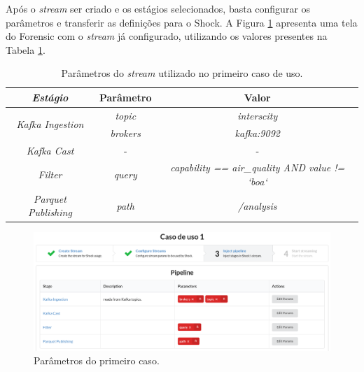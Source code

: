 

Após o \textit{stream} ser criado e os estágios selecionados, basta
configurar os parâmetros e transferir as definições para o Shock. A Figura
\ref{fig:case1} apresenta uma tela do Forensic com o \textit{stream} já
configurado, utilizando os valores presentes na Tabela \ref{tab:case1}.

\begin{table}[]
    \centering
    \caption{Parâmetros do \textit{stream} utilizado no primeiro caso de uso.}
    \label{tab:case1}
    \begin{tabular}{|c|c|c|}
        \hline
        \textit{\textbf{Estágio}}                   & \textbf{Parâmetro} & \textbf{Valor}                                         \\ \hline
        \multirow{2}{*}{\textit{Kafka Ingestion}} & \textit{topic}     & \textit{interscity}                                    \\ \cline{2-3} 
                                                  & \textit{brokers}   & \textit{kafka:9092}                                    \\ \hline
                                                  \textit{Kafka Cast}                       & -                  & -                                                      \\ \hline
                                                  \textit{Filter}                           & \textit{query}     & \textit{capability == air\_quality AND value != `boa`} \\ \hline
                                                  \textit{Parquet Publishing}               & \textit{path}      & \textit{/analysis}                                     \\ \hline
    \end{tabular}
\end{table}

\begin{figure}
  \centering
  \includegraphics[width=\textwidth]{figuras/parametros.png}
  \caption{Parâmetros do primeiro caso.}
  \label{fig:case1}
\end{figure}

